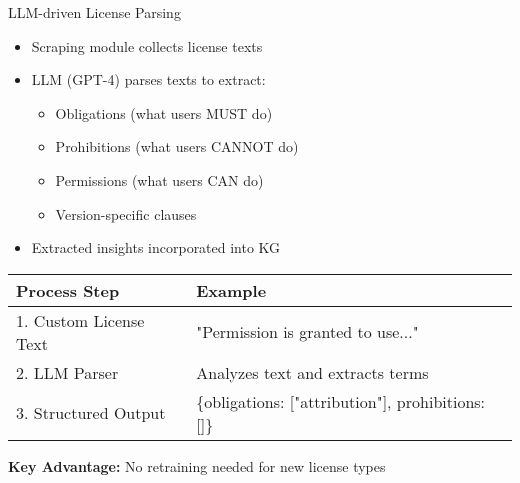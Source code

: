 \documentclass{beamer}
\begin{document}
\begin{frame}{LLM-driven License Parsing}
\begin{itemize}
\item Scraping module collects license texts
\item LLM (GPT-4) parses texts to extract:
    \begin{itemize}
    \item Obligations (what users MUST do)
    \item Prohibitions (what users CANNOT do)
    \item Permissions (what users CAN do)
    \item Version-specific clauses
    \end{itemize}
\item Extracted insights incorporated into KG
\end{itemize}

\vspace{0.3cm}
\begin{center}
\begin{tabular}{|l|l|}
\hline
\rowcolor{gray!20}
\textbf{Process Step} & \textbf{Example} \\
\hline
\rowcolor{blue!10}
1. Custom License Text & "Permission is granted to use..." \\
\hline
\rowcolor{red!10}
2. LLM Parser & Analyzes text and extracts terms \\
\hline
\rowcolor{green!10}
3. Structured Output & \{obligations: ["attribution"], prohibitions: []\} \\
\hline
\end{tabular}
\end{center}

\vspace{0.2cm}
\textbf{Key Advantage:} No retraining needed for new license types
\end{frame}
\end{document}
